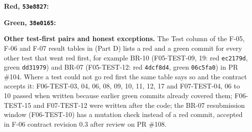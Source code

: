 \textbf{Red, \texttt{53e8827}:}


\textbf{Green, \texttt{38e0165}:}


\textbf{Other test-first pairs and honest exceptions.} The Test column of the F-05, F-06 and F-07 result tables in  (Part D) lists a red and a green commit for every other test that went red first, for example BR-10 (F05-TEST-09, 19: red \texttt{ec2179d}, green \texttt{dd31979}) and BR-07 (F05-TEST-12: red \texttt{4dcf8d4}, green \texttt{06c5fa0}) in PR \#104. Where a test could not go red first the same table says so and the contract accepts it: F06-TEST-03, 04, 06, 08, 09, 10, 11, 12, 17 and F07-TEST-04, 06 to 10 passed when written because earlier green commits already covered them; F06-TEST-15 and F07-TEST-12 were written after the code; the BR-07 resubmission window (F06-TEST-10) has a mutation check instead of a red commit, accepted in F-06 contract revision 0.3 after review on PR \#108.
